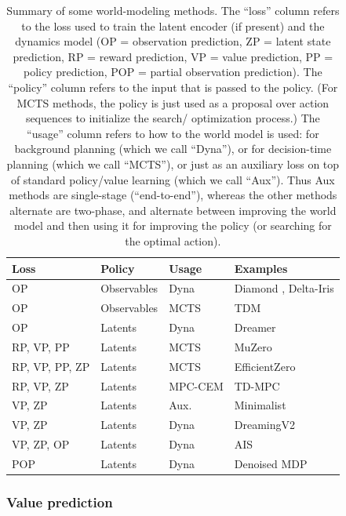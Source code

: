 \begin{table}
  \centering
  \begin{tabular}{llll}
    Loss & Policy & Usage & Examples \\ \hline
    OP & Observables & Dyna & Diamond \citep{Alonso2024}, Delta-Iris \citep{delta-iris} \\
    OP & Observables & MCTS & TDM  \citep{Schubert2023} \\
    OP & Latents & Dyna & Dreamer \citep{dreamerv3} \\
    RP, VP, PP & Latents & MCTS & MuZero \citep{Schrittwieser2020} \\
    RP, VP, PP, ZP & Latents & MCTS & EfficientZero  \citep{efficientZero} \\
    RP, VP, ZP  & Latents & MPC-CEM & TD-MPC \citep{Hansen2022} \\
    VP, ZP  & Latents & Aux. &  Minimalist \citep{Ni2024} \\
    VP, ZP & Latents & Dyna & DreamingV2  \citep{dreamingV2} \\
    VP, ZP, OP & Latents & Dyna & AIS  \citep{Subramanian2022}\\
    POP & Latents & Dyna & Denoised MDP  \citep{Wang2022}
  \end{tabular}
  \caption{Summary of some world-modeling methods.
    The ``loss'' column refers to the loss used to train
    the latent encoder (if present) and the dynamics model
    (OP = observation prediction, ZP = latent state prediction,
    RP = reward prediction, VP = value prediction,
    PP = policy prediction, POP = partial observation prediction).
    The ``policy'' column refers to the input that is passed
    to the policy.
    (For MCTS methods, the policy is just used as a proposal
    over action sequences to initialize the search/ optimization process.)
    The ``usage'' column refers to how to the world model is used:
        for  background planning (which we call ``Dyna''),
        or for decision-time planning (which we call ``MCTS''),
        or just as an auxiliary loss on top of standard policy/value
        learning (which we call ``Aux'').
        Thus Aux methods are single-stage (``end-to-end''), whereas the other
        methods alternate are two-phase, and alternate between improving the world model
    and then using it for improving the policy (or searching for the optimal action).
    }
  \label{tab:WM}
  \end{table}


\subsubsection{Value prediction}
\label{sec:valueEquivalence}

